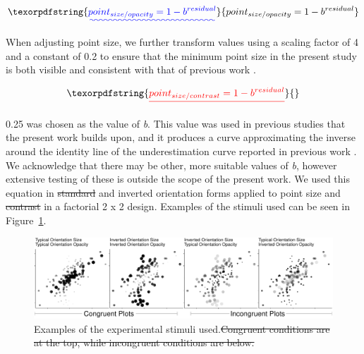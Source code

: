 \documentclass[manuscript, review, anonymous, screen]{acmart}
\providecommand{\DIFaddtex}[1]{{\protect\color{blue}\uwave{#1}}} %
\providecommand{\DIFdeltex}[1]{{\protect\color{red}\sout{#1}}}                      %
\providecommand{\DIFaddbegin}{} %
\providecommand{\DIFaddend}{} %
\providecommand{\DIFdelbegin}{} %
\providecommand{\DIFdelend}{} %
\providecommand{\DIFdelFL}[1]{\DIFdel{#1}} %
\providecommand{\DIFaddbeginFL}{} %
\providecommand{\DIFaddendFL}{} %
\providecommand{\DIFdelbeginFL}{} %
\providecommand{\DIFdelendFL}{} %
\providecommand{\DIFadd}[1]{\texorpdfstring{\DIFaddtex{#1}}{#1}} %
\providecommand{\DIFdel}[1]{\texorpdfstring{\DIFdeltex{#1}}{}} %
\newcommand{\DIFscaledelfig}{0.5}
\newlength{\DIFdelgraphicswidth} %
\newlength{\DIFdelgraphicsheight} %
\newcommand{\DIFaddincludegraphics}[2][]{{\color{blue}\fbox{\DIFOincludegraphics[#1]{#2}}}} %
\newcommand{\DIFdelincludegraphics}[2][]{%
\sbox{\DIFdelgraphicsbox}{\DIFOincludegraphics[#1]{#2}}%
\settoboxwidth{\DIFdelgraphicswidth}{\DIFdelgraphicsbox} %
\settoboxtotalheight{\DIFdelgraphicsheight}{\DIFdelgraphicsbox} %
\scalebox{\DIFscaledelfig}{%
\parbox[b]{\DIFdelgraphicswidth}{\usebox{\DIFdelgraphicsbox}\\[-\baselineskip] \rule{\DIFdelgraphicswidth}{0em}}\llap{\resizebox{\DIFdelgraphicswidth}{\DIFdelgraphicsheight}{%
\setlength{\unitlength}{\DIFdelgraphicswidth}%
\begin{picture}(1,1)%
\thicklines\linethickness{2pt} %
{\color[rgb]{1,0,0}\put(0,0){\framebox(1,1){}}}%
{\color[rgb]{1,0,0}\put(0,0){\line( 1,1){1}}}%
{\color[rgb]{1,0,0}\put(0,1){\line(1,-1){1}}}%
\end{picture}%
}\hspace*{3pt}}} %
} %
\DeclareRobustCommand{\DIFaddbegin}{\DIFOaddbegin \let\includegraphics\DIFaddincludegraphics} %
\DeclareRobustCommand{\DIFaddend}{\DIFOaddend \let\includegraphics\DIFOincludegraphics} %
\DeclareRobustCommand{\DIFdelbegin}{\DIFOdelbegin \let\includegraphics\DIFdelincludegraphics} %
\DeclareRobustCommand{\DIFdelend}{\DIFOaddend \let\includegraphics\DIFOincludegraphics} %
\DeclareRobustCommand{\DIFaddbeginFL}{\DIFOaddbeginFL \let\includegraphics\DIFaddincludegraphics} %
\DeclareRobustCommand{\DIFaddendFL}{\DIFOaddendFL \let\includegraphics\DIFOincludegraphics} %
\DeclareRobustCommand{\DIFdelbeginFL}{\DIFOdelbeginFL \let\includegraphics\DIFdelincludegraphics} %
\DeclareRobustCommand{\DIFdelendFL}{\DIFOaddendFL \let\includegraphics\DIFOincludegraphics} %
\begin{document}
\begin{equation}
  \DIFadd{point_{size/opacity} = 1 - b^{residual}
}\end{equation}

\DIFaddend When adjusting point size, we further transform values using a scaling
factor of 4 and a constant of 0.2 to ensure that the minimum point size
in the present study is both visible and consistent with that of
previous work \citep{strain_2023, strain_2023b}. \DIFdelbegin %

\begin{displaymath}
  \DIFdel{point_{size/contrast} = 1 - b^{residual}
}\end{displaymath}%

\DIFdelend 0.25 was chosen as the
value of \emph{b}. This value was used in previous studies that the
present work builds upon, and it produces a curve approximating the
inverse around the identity line of the underestimation curve reported
in previous work \citep{rensink_2017, strain_2023, strain_2023b}. We
acknowledge that there may be other, more suitable values of \emph{b},
however extensive testing of these is outside the scope of the present
work. We used this equation in \DIFdelbegin \DIFdel{standard }\DIFdelend \DIFaddbegin \DIFadd{typical }\DIFaddend and inverted orientation forms
applied to point size and \DIFdelbegin \DIFdel{contrast }\DIFdelend \DIFaddbegin \DIFadd{opacity }\DIFaddend in a factorial 2 x 2 design. Examples
of the stimuli used can be seen in Figure~\ref{fig-examples}.

\begin{figure}

\DIFdelbeginFL %
\DIFdelendFL \DIFaddbeginFL \includegraphics[width=1\textwidth,height=\textheight]{size_and_opacity_files/figure-pdf/fig-examples-1.pdf} \DIFaddendFL \hfill{}

\caption{\label{fig-examples}Examples of the experimental stimuli used.\DIFdelbeginFL \DIFdelFL{Congruent conditions are at the top, while incongruent conditions are
below.}\DIFdelendFL }

\end{figure}
\end{document}
